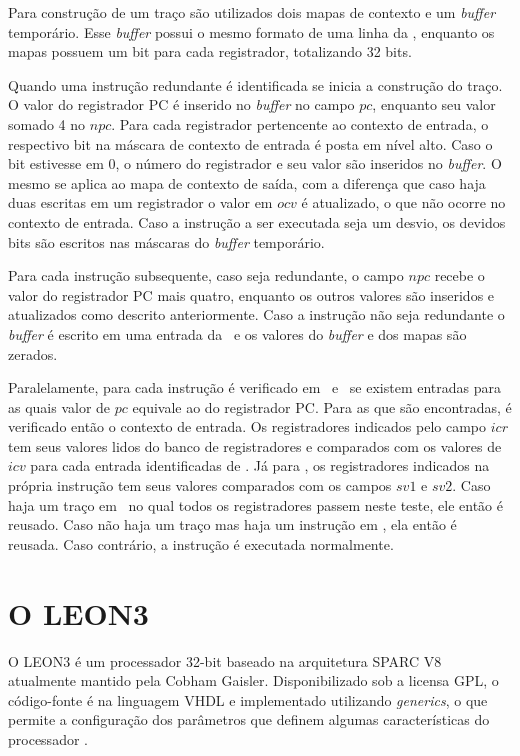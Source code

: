 Para construção de um traço são utilizados dois mapas de contexto e um \textit{buffer} temporário. Esse \textit{buffer} possui o mesmo formato de uma linha da \tablet, enquanto os mapas possuem um bit para cada registrador, totalizando 32 bits.

Quando uma instrução redundante é identificada se inicia a construção do traço. O valor do registrador PC é inserido no \textit{buffer} no campo $pc$, enquanto seu valor somado 4 no $npc$. Para cada registrador pertencente ao contexto de entrada, o respectivo bit na máscara de contexto de entrada é posta em nível alto. Caso o bit estivesse em $0$, o número do registrador e seu valor são inseridos no \textit{buffer}. O mesmo se aplica ao mapa de contexto de saída, com a diferença que caso haja duas escritas em um registrador o valor em $ocv$ é atualizado, o que não ocorre no contexto de entrada. Caso a instrução a ser executada seja um desvio, os devidos bits são escritos nas máscaras do \textit{buffer} temporário. 

Para cada instrução subsequente, caso seja redundante, o campo $npc$ recebe o valor do registrador PC mais quatro, enquanto os outros valores são inseridos e atualizados como descrito anteriormente. Caso a instrução não seja redundante o \textit{buffer} é escrito em uma entrada da \tablet\ e os valores do \textit{buffer} e dos mapas são zerados.

Paralelamente, para cada instrução é verificado em \tableg\ e \tablet\ se existem entradas para as quais valor de $pc$ equivale ao do registrador PC. Para as que são encontradas, é verificado então o contexto de entrada. Os registradores indicados pelo campo $icr$ tem seus valores lidos do banco de registradores e comparados com os valores de $icv$ para cada entrada identificadas de \tablet. Já para \tableg, os registradores indicados na própria instrução tem seus valores comparados com os campos $sv1$ e $sv2$. Caso haja um traço em \tablet\ no qual todos os registradores passem neste teste, ele então é reusado. Caso não haja um traço mas haja um instrução em \tableg, ela então é reusada. Caso contrário, a instrução é executada normalmente.

\section{O LEON3}
\label{Fundamentacao:LEON3}

O LEON3 é um processador 32-bit baseado na arquitetura SPARC V8 atualmente mantido pela Cobham Gaisler. Disponibilizado sob a licensa GPL, o código-fonte é na linguagem VHDL e implementado utilizando \textit{generics}, o que permite a configuração dos parâmetros que definem algumas características do processador \cite{grlibmanual}.

